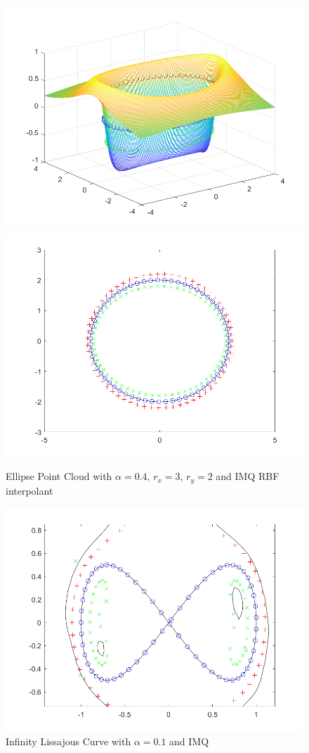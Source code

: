 \documentclass{article}
\begin{document}
\begin{figure}[h!]
    \includegraphics[scale = 0.3]{ellipsePCSurf.png}
    \includegraphics[scale = 0.3]{implicitellipseRBF.png}
    \centering
    \caption{Ellipse Point Cloud with $\alpha = 0.4$, $r_x = 3$, $r_y = 2$ and IMQ RBF interpolant}
\end{figure}
\begin{figure}[h!]
    \includegraphics[scale = 0.4]{infinitySymbolCurve.png}
    \centering
    \caption{Infinity Lissajous Curve with $\alpha = 0.1$ and IMQ}
\end{figure}
\end{document}
